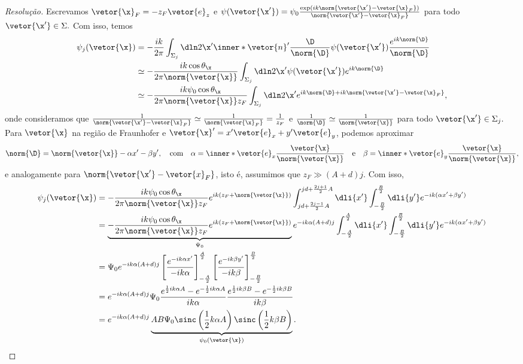 \begin{proof}[Resolução]
    Escrevamos \(\vetor{\x}_F = -z_F \vetor{e}_z\) e \(\psi(\vetor{\x'}) = \psi_0 \frac{\exp(ik\norm{\vetor{\x'} - \vetor{\x}_F})}{\norm{\vetor{\x'} - \vetor{\x}_F}}\) para todo \(\vetor{\x'} \in \Sigma.\) Com isso, temos
    \begin{align*}
        \psi_j(\vetor{\x}) &= - \frac{i k}{2\pi} \int_{\Sigma_j} \dln2{\x'} \inner*{\vetor{n}'}{\frac{\D}{\norm{\D}}} \psi(\vetor{\x'}) \frac{e^{ik \norm{\D}}}{\norm{\D}}\\
                         &\simeq -\frac{ik \cos\theta_{\x}}{2\pi \norm{\vetor{\x}}} \int_{\Sigma_j} \dln2{\x'} \psi(\vetor{\x'}) e^{ik \norm{\D}}\\
                         &\simeq -\frac{ik \psi_0 \cos\theta_{\x}}{2\pi \norm{\vetor{\x}} z_F} \int_{\Sigma_j} \dln2{\x'} e^{ik \norm{\D} + ik \norm{\vetor{\x'} - \vetor{\x}_F}},
    \end{align*}
    onde consideramos que \(\frac{1}{\norm{\vetor{\x'} - \vetor{\x}_F}} \simeq \frac{1}{\norm{\vetor{\x}_F}} = \frac{1}{z_F}\) e \(\frac{1}{\norm{\D}} \simeq \frac{1}{\norm{\vetor{\x}}}\) para todo \(\vetor{\x'} \in \Sigma_j.\) Para \(\vetor{\x}\) na região de Fraunhofer e \(\vetor{\x}' = x' \vetor{e}_x + y'\vetor{e}_y\), podemos aproximar
    \begin{equation*}
        \norm{\D} = \norm{\vetor{\x}} - \alpha x' - \beta y',\quad\text{com}\quad \alpha = \inner*{\vetor{e}_x}{\frac{\vetor{\x}}{\norm{\vetor{\x}}}}\quad\text{e}\quad\beta = \inner*{\vetor{e}_y}{\frac{\vetor{\x}}{\norm{\vetor{\x}}}},
    \end{equation*}
    e analogamente para \(\norm{\vetor{\x'} - \vetor{x}_F}\), isto é, assumimos que \(z_F \gg (A + d)j\). Com isso, 
    \begin{align*}
        \psi_j(\vetor{\x}) &= -\frac{ik \psi_0 \cos\theta_{\x}}{2\pi \norm{\vetor{\x}} z_F} e^{ik (z_F + \norm{\vetor{\x}})} \int_{jd + \frac{2j - 1}{2}A}^{jd + \frac{2j + 1}{2}A} \dli{x'} \int_{-\frac{B}{2}}^{\frac{B}{2}} \dli{y'} e^{-ik (\alpha x' + \beta y')}\\
                           &= \underbrace{-\frac{ik \psi_0 \cos\theta_{\x}}{2\pi \norm{\vetor{\x}} z_F} e^{ik(z_F + \norm{\vetor{\x}})}}_{\Psi_0} e^{- ik\alpha(A + d)j} \int_{-\frac{A}{2}}^{\frac{A}{2}} \dli{x'} \int_{-\frac{B}{2}}^{\frac{B}{2}} \dli{y'} e^{-ik (\alpha x' + \beta y')}\\
                           &= \Psi_0 e^{-ik\alpha(A + d)j} \left[\frac{e^{-ik \alpha x'}}{-ik \alpha}\right]_{-\frac{A}{2}}^{\frac{A}{2}} \left[\frac{e^{-ik \beta y'}}{-ik \beta}\right]_{-\frac{B}{2}}^{\frac{B}{2}}\\
                           &= e^{-ik\alpha(A + d)j} \Psi_0  \frac{e^{\frac12 ik \alpha A} - e^{-\frac12 ik \alpha A}}{ik \alpha}\frac{e^{\frac12 ik \beta B} - e^{-\frac12 ik \beta B}}{ik \beta}\\
                           &= e^{-ik \alpha(A + d)j} \underbrace{AB \Psi_0 \sinc\left(\frac12 k \alpha A\right) \sinc\left(\frac12 k \beta B\right)}_{\psi_0(\vetor{\x})}.
    \end{align*}


\end{proof}
